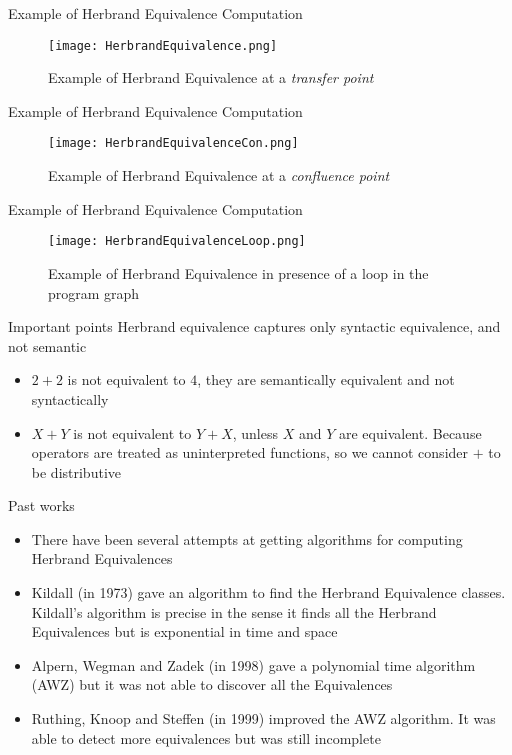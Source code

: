 \documentclass[11pt]{beamer}
\begin{document}
\begin{frame}{Example of Herbrand Equivalence Computation}
    \begin{figure}[!h]
        \centering
        \texttt{[image: HerbrandEquivalence.png]}
        \caption{Example of Herbrand Equivalence at a \textit{transfer point}}
        \label{fig:herbrandExample}
    \end{figure}
\end{frame}

\begin{frame}{Example of Herbrand Equivalence Computation}
    \begin{figure}[!h]
        \centering
        \texttt{[image: HerbrandEquivalenceCon.png]}
        \caption{Example of Herbrand Equivalence at a \textit{confluence point}}
        \label{fig:herbrandExample}
    \end{figure}
\end{frame}

\begin{frame}{Example of Herbrand Equivalence Computation}
    \begin{figure}[!h]
        \centering
        \texttt{[image: HerbrandEquivalenceLoop.png]}
        \caption{Example of Herbrand Equivalence in presence of a loop in the program graph}
        \label{fig:herbrandExample}
    \end{figure}
\end{frame}

\begin{frame}{Important points}
    Herbrand equivalence captures only syntactic equivalence, and not semantic
    \begin{itemize}
        \item $2 + 2$ is not equivalent to $4$, they are semantically equivalent and not syntactically 
        \item $X + Y$ is not equivalent to $Y + X$, unless $X$ and $Y$ are equivalent. Because operators are treated as uninterpreted functions, so we cannot consider $+$ to be distributive
    \end{itemize}
\end{frame}

\begin{frame}{Past works}
    \begin{itemize}
        \item There have been several attempts at getting algorithms for computing Herbrand Equivalences
        \item Kildall (in 1973) gave an algorithm to find the Herbrand Equivalence classes. Kildall's algorithm is precise in the sense it finds all the Herbrand Equivalences but is exponential in time and space
        \item Alpern, Wegman and Zadek (in 1998) gave a polynomial time algorithm (AWZ) but it was not able to discover all the Equivalences
        \item Ruthing, Knoop and Steffen (in 1999) improved the AWZ algorithm. It was able to detect more equivalences but was still incomplete
    \end{itemize}
\end{frame}
\end{document}
